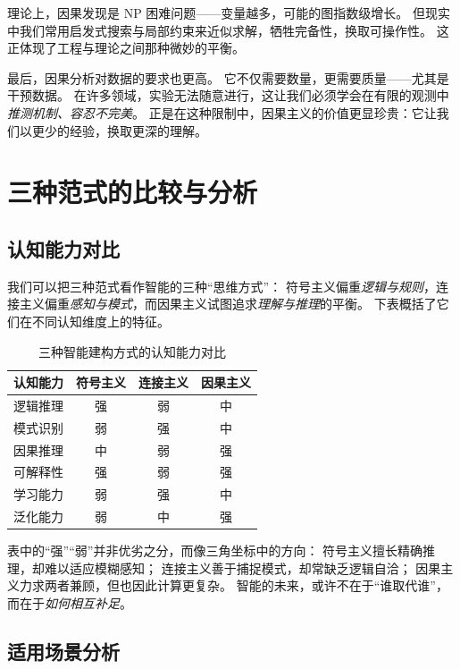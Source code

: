 理论上，因果发现是 NP 困难问题——变量越多，可能的图指数级增长。  
但现实中我们常用启发式搜索与局部约束来近似求解，牺牲完备性，换取可操作性。  
这正体现了工程与理论之间那种微妙的平衡。

最后，因果分析对数据的要求也更高。  
它不仅需要数量，更需要质量——尤其是干预数据。  
在许多领域，实验无法随意进行，这让我们必须学会在有限的观测中\emph{推测机制、容忍不完美}。  
正是在这种限制中，因果主义的价值更显珍贵：它让我们以更少的经验，换取更深的理解。

\section{三种范式的比较与分析}

\subsection{认知能力对比}

我们可以把三种范式看作智能的三种“思维方式”：  
符号主义偏重\emph{逻辑与规则}，连接主义偏重\emph{感知与模式}，而因果主义试图追求\emph{理解与推理}的平衡。  
下表概括了它们在不同认知维度上的特征。  

\begin{table}[h]
\centering
\caption{三种智能建构方式的认知能力对比}
\begin{tabular}{|l|c|c|c|}
\hline
\textbf{认知能力} & \textbf{符号主义} & \textbf{连接主义} & \textbf{因果主义} \\
\hline
逻辑推理 & 强 & 弱 & 中 \\
模式识别 & 弱 & 强 & 中 \\
因果推理 & 中 & 弱 & 强 \\
可解释性 & 强 & 弱 & 强 \\
学习能力 & 弱 & 强 & 中 \\
泛化能力 & 弱 & 中 & 强 \\
\hline
\end{tabular}
\end{table}

表中的“强”“弱”并非优劣之分，而像三角坐标中的方向：  
符号主义擅长精确推理，却难以适应模糊感知；  
连接主义善于捕捉模式，却常缺乏逻辑自洽；  
因果主义力求两者兼顾，但也因此计算更复杂。  
智能的未来，或许不在于“谁取代谁”，而在于\emph{如何相互补足}。

\subsection{适用场景分析}

